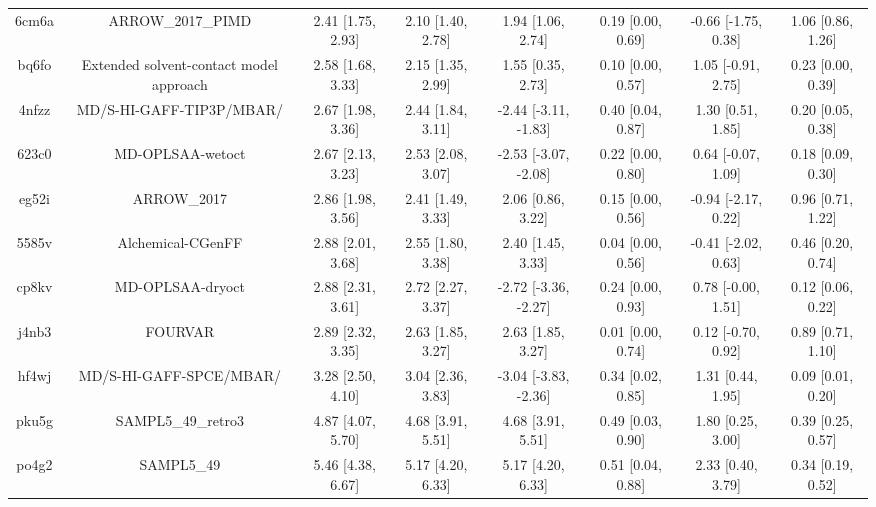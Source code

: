 \documentclass{article}
\begin{document}
\begin{center}
\begin{longtable}{|cccccccc|}
 6cm6a &                                  ARROW\_2017\_PIMD &  2.41 [1.75, 2.93] &  2.10 [1.40, 2.78] &     1.94 [1.06, 2.74] &  0.19 [0.00, 0.69] &  -0.66 [-1.75, 0.38] &     1.06 [0.86, 1.26] \\
 bq6fo &            Extended solvent-contact model approach &  2.58 [1.68, 3.33] &  2.15 [1.35, 2.99] &     1.55 [0.35, 2.73] &  0.10 [0.00, 0.57] &   1.05 [-0.91, 2.75] &     0.23 [0.00, 0.39] \\
 4nfzz &                           MD/S-HI-GAFF-TIP3P/MBAR/ &  2.67 [1.98, 3.36] &  2.44 [1.84, 3.11] &  -2.44 [-3.11, -1.83] &  0.40 [0.04, 0.87] &    1.30 [0.51, 1.85] &     0.20 [0.05, 0.38] \\
 623c0 &                                   MD-OPLSAA-wetoct &  2.67 [2.13, 3.23] &  2.53 [2.08, 3.07] &  -2.53 [-3.07, -2.08] &  0.22 [0.00, 0.80] &   0.64 [-0.07, 1.09] &     0.18 [0.09, 0.30] \\
 eg52i &                                        ARROW\_2017 &  2.86 [1.98, 3.56] &  2.41 [1.49, 3.33] &     2.06 [0.86, 3.22] &  0.15 [0.00, 0.56] &  -0.94 [-2.17, 0.22] &     0.96 [0.71, 1.22] \\
 5585v &                                  Alchemical-CGenFF &  2.88 [2.01, 3.68] &  2.55 [1.80, 3.38] &     2.40 [1.45, 3.33] &  0.04 [0.00, 0.56] &  -0.41 [-2.02, 0.63] &     0.46 [0.20, 0.74] \\
 cp8kv &                                   MD-OPLSAA-dryoct &  2.88 [2.31, 3.61] &  2.72 [2.27, 3.37] &  -2.72 [-3.36, -2.27] &  0.24 [0.00, 0.93] &   0.78 [-0.00, 1.51] &     0.12 [0.06, 0.22] \\
 j4nb3 &                                            FOURVAR &  2.89 [2.32, 3.35] &  2.63 [1.85, 3.27] &     2.63 [1.85, 3.27] &  0.01 [0.00, 0.74] &   0.12 [-0.70, 0.92] &     0.89 [0.71, 1.10] \\
 hf4wj &                            MD/S-HI-GAFF-SPCE/MBAR/ &  3.28 [2.50, 4.10] &  3.04 [2.36, 3.83] &  -3.04 [-3.83, -2.36] &  0.34 [0.02, 0.85] &    1.31 [0.44, 1.95] &     0.09 [0.01, 0.20] \\
 pku5g &                                 SAMPL5\_49\_retro3 &  4.87 [4.07, 5.70] &  4.68 [3.91, 5.51] &     4.68 [3.91, 5.51] &  0.49 [0.03, 0.90] &    1.80 [0.25, 3.00] &     0.39 [0.25, 0.57] \\
 po4g2 &                                         SAMPL5\_49 &  5.46 [4.38, 6.67] &  5.17 [4.20, 6.33] &     5.17 [4.20, 6.33] &  0.51 [0.04, 0.88] &    2.33 [0.40, 3.79] &     0.34 [0.19, 0.52] \\
\end{longtable}
\end{center}
\end{document}
